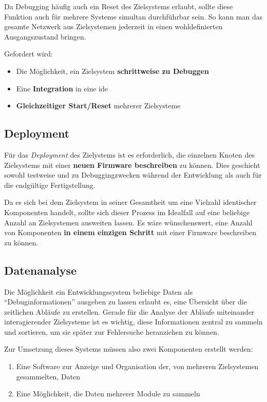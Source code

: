 Da Debugging häufig auch ein Reset des Zielsystems erlaubt, sollte diese
Funktion auch für mehrere Systeme simultan durchführbar sein. So kann man das
gesamte Netzwerk aus Zielsystemen jederzeit in einen wohldefinierten
Ausgangszustand bringen.

Gefordert wird:
\begin{itemize}
  \item Die Möglichkeit, ein Zielsystem \textbf{schrittweise zu Debuggen}
  \item Eine \textbf{Integration} in eine \gls{ide}
  \item \textbf{Gleichzeitiger Start/Reset} mehrerer Zielsysteme
\end{itemize}

\subsection{Deployment} Für das \emph{Deployment} des Zielystems ist es
erforderlich, die einzelnen Knoten des Zielsystems mit einer \textbf{neuen Firmware
beschreiben} zu können. Dies geschieht sowohl testweise und zu Debuggingzwecken
während der Entwicklung als auch für die endgültige Fertigstellung. 

Da es sich bei dem Zielsystem in seiner Gesamtheit um eine Vielzahl identischer
Komponenten handelt, sollte sich dieser Prozess im Idealfall auf
eine beliebige Anzahl an Zielsystemen ausweiten lassen. Es wäre wünschenswert,
eine Anzahl von Komponenten \textbf{in einem einzigen Schritt} mit einer
Firmware beschreiben zu können.

\subsection{Datenanalyse}
Die Möglichkeit ein Entwicklungssystem beliebige
Daten als "`Debuginformationen"' ausgeben zu lassen erlaubt es, eine
Übersicht über die zeitlichen Abläufe zu erstellen. Gerade für die
Analyse der Abläufe miteinander interagierender Zielsysteme ist es wichtig,
diese Informationen zentral zu sammeln und sortieren, um sie später zur
Fehlersuche heranziehen zu können.

Zur Umsetzung dieses Systems müssen also zwei Komponenten erstellt werden:
\begin{enumerate}
  \item Eine Software zur Anzeige und Organisation der, von mehreren
  Zielsystemen gesammelten, Daten
  \item Eine Möglichkeit, die Daten mehrerer Module zu sammeln
\end{enumerate}


